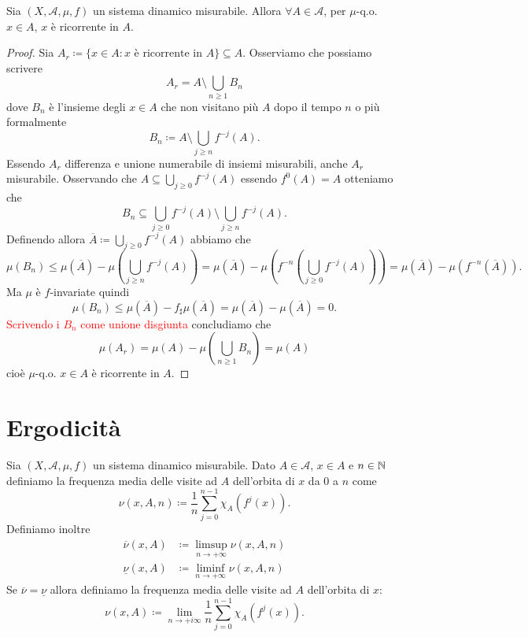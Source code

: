 \begin{thm}
    Sia $ (X, \mathcal{A}, \mu, f) $ un sistema dinamico misurabile. Allora $ \forall A \in \mathcal{A} $, per $ \mu $-q.o. $ x \in A $, $ x $ è ricorrente in $ A $. 
\end{thm}
\begin{proof}
    Sia $ A_r \coloneqq \{x \in A : x \text{ è ricorrente in } A\} \subseteq A $. Osserviamo che possiamo scrivere
    \[
    A_r = A \setminus \bigcup_{n \geq 1} B_n
    \]
    dove $ B_n $ è l'insieme degli $ x \in A $ che non visitano più $ A $ dopo il tempo $ n $ o più formalmente  
    \[
    B_n \coloneqq A \setminus \bigcup_{j \geq n} f^{-j}(A).
    \]
    Essendo $ A_r $ differenza e unione numerabile di insiemi misurabili, anche $ A_r $ misurabile. Osservando che $ A \subseteq \bigcup_{j \geq 0} f^{-j}(A) $ essendo $ f^{0}(A) = A $ otteniamo che 
    \[
    B_n \subseteq \bigcup_{j \geq 0} f^{-j}(A) \setminus  \bigcup_{j \geq n} f^{-j}(A).
    \]
    Definendo allora $ \overline{A} \coloneqq \bigcup_{j \geq 0} f^{-j}(A) $ abbiamo che 
    \[
    \mu(B_n) \leq \mu(\overline{A}) - \mu\left(\textstyle{\bigcup_{j \geq n}} f^{-j}(A)\right) = \mu(\overline{A}) - \mu\left(f^{-n}\left(\textstyle{\bigcup_{j \geq 0}} f^{-j}(A)\right)\right) = \mu(\overline{A}) - \mu(f^{-n}(\overline{A})).
    \]
    Ma $ \mu $ è $ f $-invariate quindi
    \[
    \mu(B_n) \leq \mu(\overline{A}) - f_{\sharp}\mu(\overline{A}) = \mu(\overline{A}) - \mu(\overline{A}) = 0.
    \]
    \textcolor{red}{Scrivendo i $ B_n $ come unione disgiunta} concludiamo che 
    \[
    \mu(A_r) = \mu(A) - \mu\left(\textstyle{\bigcup_{n \geq 1}} B_n\right) = \mu(A)
    \]
    cioè $ \mu $-q.o. $ x \in A $ è ricorrente in $ A $.
\end{proof}

\section{Ergodicità}

\begin{definition}
    Sia $ (X, \mathcal{A}, \mu, f) $ un sistema dinamico misurabile. Dato $ A \in \mathcal{A} $, $ x \in A $ e $ n \in \mathbb{N} $ definiamo la frequenza media delle visite ad $ A $ dell'orbita di $ x $ da $ 0 $ a $ n $ come
    \[
        \nu(x, A, n) \coloneqq \frac{1}{n} \sum_{j = 0}^{n-1} \chi_A(f^{j}(x)).
    \]
    Definiamo inoltre
    \begin{align*}
        \overline{\nu}(x, A) & \coloneqq \limsup_{n \to +\infty} \nu(x, A, n) \\
        \underline{\nu}(x, A) & \coloneqq \liminf_{n \to +\infty} \nu(x, A, n)
    \end{align*}
    Se $ \overline{\nu} = \underline{\nu} $ allora definiamo la frequenza media delle visite ad $ A $ dell'orbita di $ x $:
    \[
        \nu(x, A) \coloneqq \lim_{n \to +i\infty} \frac{1}{n} \sum_{j = 0}^{n-1} \chi_A(f^{j}(x)).
    \]
\end{definition}

